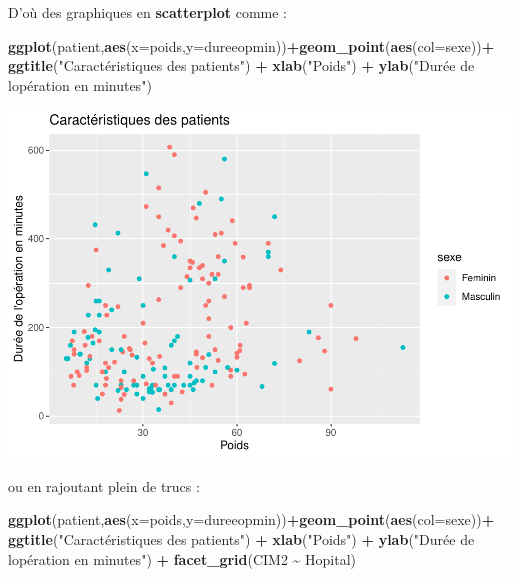\documentclass[
]{book}
\newenvironment{Shaded}{\begin{snugshade}}{\end{snugshade}}
\newcommand{\AttributeTok}[1]{\textcolor[rgb]{0.13,0.29,0.53}{#1}}
\newcommand{\FunctionTok}[1]{\textcolor[rgb]{0.13,0.29,0.53}{\textbf{#1}}}
\newcommand{\NormalTok}[1]{#1}
\newcommand{\SpecialCharTok}[1]{\textcolor[rgb]{0.81,0.36,0.00}{\textbf{#1}}}
\newcommand{\StringTok}[1]{\textcolor[rgb]{0.31,0.60,0.02}{#1}}
\begin{document}
D'où des graphiques en \textbf{scatterplot} comme :

\begin{Shaded}
\begin{Highlighting}[]
\FunctionTok{ggplot}\NormalTok{(patient,}\FunctionTok{aes}\NormalTok{(}\AttributeTok{x=}\NormalTok{poids,}\AttributeTok{y=}\NormalTok{dureeopmin))}\SpecialCharTok{+}\FunctionTok{geom\_point}\NormalTok{(}\FunctionTok{aes}\NormalTok{(}\AttributeTok{col=}\NormalTok{sexe))}\SpecialCharTok{+}
  \FunctionTok{ggtitle}\NormalTok{(}\StringTok{"Caractéristiques des patients"}\NormalTok{) }\SpecialCharTok{+} 
  \FunctionTok{xlab}\NormalTok{(}\StringTok{"Poids"}\NormalTok{) }\SpecialCharTok{+} 
  \FunctionTok{ylab}\NormalTok{(}\StringTok{"Durée de l\textquotesingle{}opération en minutes"}\NormalTok{) }
\end{Highlighting}
\end{Shaded}

\includegraphics{_main_files/figure-latex/ggplot15-1.pdf}

ou en rajoutant plein de trucs :

\begin{Shaded}
\begin{Highlighting}[]
\FunctionTok{ggplot}\NormalTok{(patient,}\FunctionTok{aes}\NormalTok{(}\AttributeTok{x=}\NormalTok{poids,}\AttributeTok{y=}\NormalTok{dureeopmin))}\SpecialCharTok{+}\FunctionTok{geom\_point}\NormalTok{(}\FunctionTok{aes}\NormalTok{(}\AttributeTok{col=}\NormalTok{sexe))}\SpecialCharTok{+}
  \FunctionTok{ggtitle}\NormalTok{(}\StringTok{"Caractéristiques des patients"}\NormalTok{) }\SpecialCharTok{+} 
  \FunctionTok{xlab}\NormalTok{(}\StringTok{"Poids"}\NormalTok{) }\SpecialCharTok{+} 
  \FunctionTok{ylab}\NormalTok{(}\StringTok{"Durée de l\textquotesingle{}opération en minutes"}\NormalTok{) }\SpecialCharTok{+}
  \FunctionTok{facet\_grid}\NormalTok{(CIM2 }\SpecialCharTok{\textasciitilde{}}\NormalTok{ Hopital)}
\end{Highlighting}
\end{Shaded}
\end{document}
